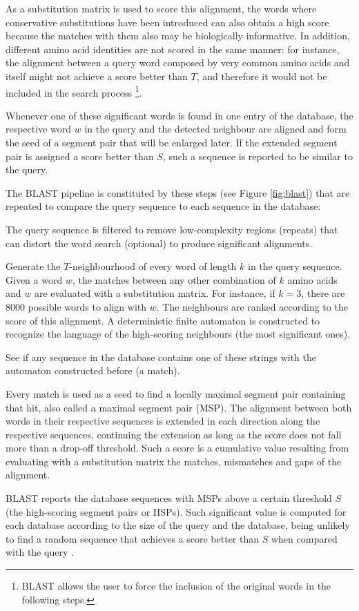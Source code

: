 As a substitution matrix is used to score this alignment, the words where conservative substitutions 
have been introduced can also obtain a high score because the matches with them also may be biologically 
informative. In addition, different amino acid identities are not scored in the same manner: for instance,
the alignment between a query word composed by very common amino acids and itself might not achieve a 
score better than $T$, and therefore it would not be included in the search process \footnote{BLAST 
allows the user to force the inclusion of the original words in the following steps.}.

Whenever one of these significant words is found in one entry of the database, the respective word $w$ 
in the query and the detected neighbour are aligned and form the seed of a segment pair that will be
enlarged later. If the extended segment pair is assigned a score better than $S$, such a sequence is
reported to be similar to the query.

The BLAST pipeline is constituted by these steps (see Figure \ref{fig:blast}) that are repeated 
to compare the query sequence to each sequence in the database:

\begin{menumerate}
\item
The query sequence is filtered to remove low-complexity regions (repeats) that can distort the word
search (optional) to produce significant alignments.
\item
Generate the $T$-neighbourhood of every word of length $k$ in the query sequence. Given a word $w$, the
matches between any other combination of $k$ amino acids and $w$ are evaluated with a substitution matrix.
For instance, if $k=3$, there are $8000$ possible words to align with $w$. The neighbours are ranked 
according to the score of this alignment. A deterministic finite automaton is constructed to recognize
the language of the high-scoring neighbours (the most significant ones).
\item
See if any sequence in the database contains one of these strings with the automaton constructed before
(a match). 
\item
Every match is used as a seed to find a locally maximal segment pair containing that hit, also called 
a maximal segment pair (MSP). The alignment between both words in their respective sequences is extended 
in each direction along the respective sequences, continuing the extension as long as the score does not
fall more than a drop-off threshold. Such a score is a cumulative value resulting from evaluating with a 
substitution matrix the matches, mismatches and gaps of the alignment.
\item
BLAST reports the database sequences with MSPs above a certain threshold $S$ (the high-scoring segment 
pairs or HSPs). Such significant value is computed for each database according to the size of the query
and the database, being unlikely to find a random sequence that achieves a score better than $S$ when 
compared with the query \citep{karlin:1990a}. 
\end{menumerate}

